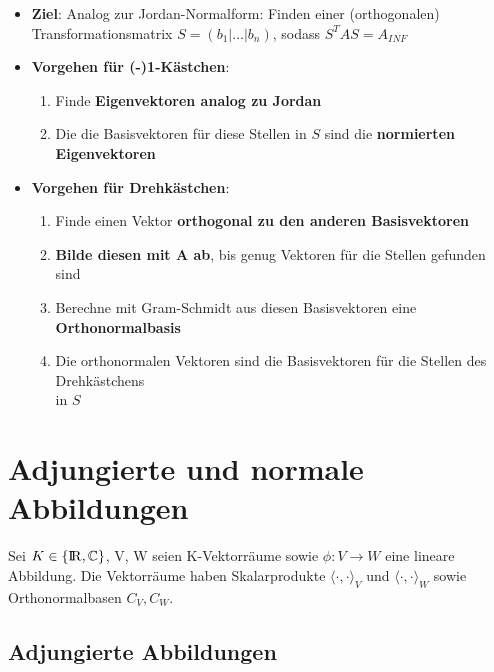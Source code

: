 \documentclass[10pt,a4paper]{article}
\def\realnumbers{{\rm I\!R}}
\def\complexnumbers{{\mathbb{C}}}
\begin{document}
	\begin{itemize}
		\item \textbf{Ziel}: Analog zur Jordan-Normalform: Finden einer (orthogonalen) Transformationsmatrix $S = (b_1 | \dots | b_n)$, sodass $S^TAS = A_{INF}$
		\item \textbf{Vorgehen für (-)1-Kästchen}:
		\begin{enumerate}
			\item Finde \textbf{Eigenvektoren analog zu Jordan}
			\item Die die Basisvektoren für diese Stellen in $S$ sind die \textbf{normierten Eigenvektoren}
		\end{enumerate}
		\item \textbf{Vorgehen für Drehkästchen}:
		\begin{enumerate}
			\item Finde einen Vektor \textbf{orthogonal zu den anderen Basisvektoren}
			\item \textbf{Bilde diesen mit A ab}, bis genug Vektoren für die Stellen gefunden sind
			\item Berechne mit Gram-Schmidt aus diesen Basisvektoren eine \textbf{Orthonormalbasis}
			\item Die orthonormalen Vektoren sind die Basisvektoren für die Stellen des Drehkästchens\\in $S$
		\end{enumerate}
	\end{itemize}

	\newpage
	\section{Adjungierte und normale Abbildungen}
	\label{aa:sec:adjungierte_und_normale_abbildungen}
	
	Sei $K \in \{\realnumbers, \complexnumbers\}$, V, W seien K-Vektorräume sowie $\phi: V \rightarrow W$ eine lineare Abbildung. Die Vektorräume haben Skalarprodukte $\langle \cdot, \cdot\rangle_V$ und $\langle \cdot, \cdot\rangle_W$ sowie Orthonormalbasen $C_V, C_W$.
	
	\subsection{Adjungierte Abbildungen}
	\label{aa:sub:adjungierte_abbildungen}
\end{document}

